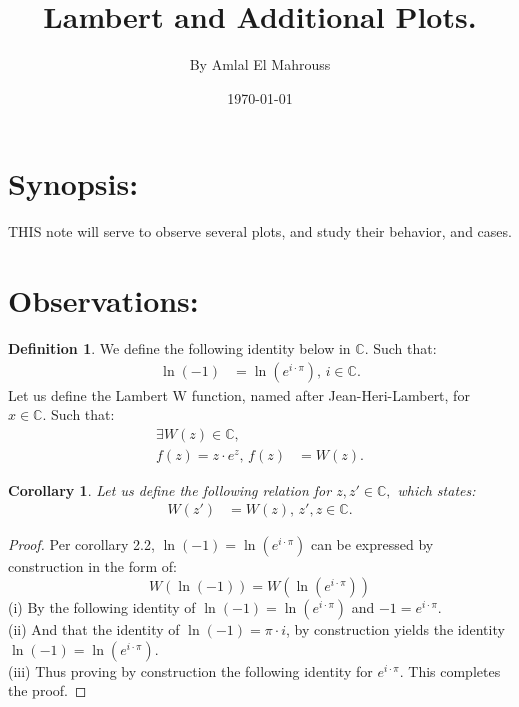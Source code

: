 \documentclass[10pt]{article}
\title{%
	\vspace{-1.5em}%
	\large\textbf{Lambert and Additional Plots.}%
}
\author{By Amlal El Mahrouss}
\date{\today}
\theoremstyle{plain}
\newtheorem{corollary}[theorem]{Corollary}
\theoremstyle{definition}
\newtheorem{definition}[theorem]{Definition}
\theoremstyle{remark}
\begin{document}

\maketitle
\tableofcontents
\newpage

\section{Synopsis:}

\lettrine[lines=1, lhang=0.1, loversize=0.2]{T}HIS note will serve to observe several plots, and study their behavior, and cases.

\section{Observations:}

\begin{definition}
	We define the following identity below in $\mathbb{C}.$ Such that:
	\begin{align*}
		\ln(-1)&=\ln(e^{i \cdot \pi}), \, i \in \mathbb{C}.
	\end{align*}
	Let us define the Lambert W function, named after Jean-Heri-Lambert, for $x \in \mathbb{C}.$ Such that:
	\begin{align*}
		\exists W(z) \in \mathbb{C},\\
		f(z) = z \cdot e^{z}, \, f(z) &= W(z).
	\end{align*}
\end{definition}

\begin{corollary}
	Let us define the following relation for $z, z' \in \mathbb{C},$ which states:
	\begin{align*}
		W(z') &= W(z), \, z', z \in \mathbb{C}.
	\end{align*}
\end{corollary}

\begin{proof}
	Per corollary 2.2, $\ln(-1)=\ln(e^{i \cdot \pi})$ can be expressed by construction in the form of:
	\begin{equation}
		W(\ln(-1)) = W(\ln(e^{i \cdot \pi}))
	\end{equation}
	(i) By the following identity of $\ln(-1)=\ln(e^{i \cdot \pi})$ and $-1 = e^{i \cdot \pi}.$\\
	(ii) And that the identity of $\ln(-1) = \pi \cdot i$, by construction yields the identity $\ln(-1) = \ln(e^{i \cdot \pi}).$\\
	(iii) Thus proving by construction the following identity for $e^{i \cdot \pi}$. This completes the proof.
\end{proof}
\end{document}
